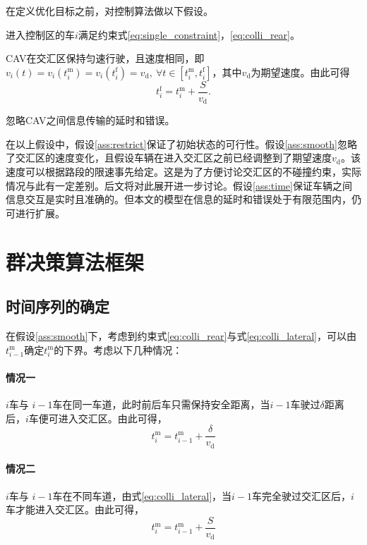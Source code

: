 在定义优化目标之前，对控制算法做以下假设。
\begin{assumption}
进入控制区的车$i$满足约束式\ref{eq:single_constraint}，\ref{eq:colli_rear}。
\label{ass:restrict}
\end{assumption}
\begin{assumption}
CAV在交汇区保持匀速行驶，且速度相同，即$v_i(t) = v_i(t_i^\mathrm{m}) = v_i(t_i^\mathrm{f}) = v_\mathrm{d}, \ \forall t\in [t_i^\mathrm{m},t_i^\mathrm{f}]$，其中$v_\mathrm{d}$为期望速度。由此可得
\begin{equation}
t_i^\mathrm{f}=t_i^\mathrm{m} + \frac{S}{v_\mathrm{d}}.
\end{equation}
\label{ass:smooth}
\end{assumption}
\begin{assumption}
忽略CAV之间信息传输的延时和错误。
\label{ass:time}
\end{assumption}

在以上假设中，假设\ref{ass:restrict}保证了初始状态的可行性。假设\ref{ass:smooth}忽略了交汇区的速度变化，且假设车辆在进入交汇区之前已经调整到了期望速度$v_\mathrm{d}$。该速度可以根据路段的限速事先给定。这是为了方便讨论交汇区的不碰撞约束，实际情况与此有一定差别。后文将对此展开进一步讨论。假设\ref{ass:time}保证车辆之间信息交互是实时且准确的。但本文的模型在信息的延时和错误处于有限范围内，仍可进行扩展。

\section{群决策算法框架}
\subsection{时间序列的确定}
在假设\ref{ass:smooth}下，考虑到约束式\ref{eq:colli_rear}与式\ref{eq:colli_lateral}，可以由$t_{i-1}^\mathrm{m}$确定$t_i^\mathrm{m}$的下界。考虑以下几种情况：
\paragraph{情况一} $i$车与 $i-1$车在同一车道，此时前后车只需保持安全距离，当$i-1$车驶过$\delta$距离后，$i$车便可进入交汇区。由此可得，
\begin{equation}
t_i^\mathrm{m}=t_{i-1}^\mathrm{m} + \frac{\delta}{v_\mathrm{d}}
\end{equation}
\paragraph{情况二}  $i$车与 $i-1$车在不同车道，由式\ref{eq:colli_lateral}，当$i-1$车完全驶过交汇区后，$i$车才能进入交汇区。由此可得，
\begin{equation}
t_i^\mathrm{m}=t_{i-1}^\mathrm{m} + \frac{S}{v_\mathrm{d}}
\end{equation}

